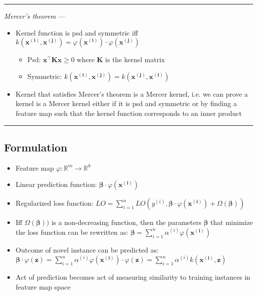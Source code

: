 {\color{lightgray}\hrule height 0.001mm}

\emph{Mercer's theorem} ---
\begin{itemize}
    \item Kernel function is psd and symmetric iff $k(\boldsymbol{x^{(i)}}, \boldsymbol{x^{(j)}}) = \varphi(\boldsymbol{x^{(i)}}) \cdot \varphi(\boldsymbol{x^{(j)}})$
    \begin{itemize}
        \item Psd: $\boldsymbol{x}^\intercal \boldsymbol{K} \boldsymbol{x} \geq 0$ where $\boldsymbol{K}$ is the kernel matrix
        \item Symmetric: $k(\boldsymbol{x^{(i)}}, \boldsymbol{x^{(j)}}) = k(\boldsymbol{x^{(j)}}, \boldsymbol{x^{(i)}})$
    \end{itemize}
    \item Kernel that satisfies Mercer's theorem is a Mercer kernel, i.e. we can prove a kernel is a Mercer kernel either if it is psd and symmetric or by finding a feature map such that the kernel function corresponds to an inner product    
\end{itemize}

{\color{black}\hrule height 0.001mm}

\subsection*{Formulation}

\begin{itemize}
    \item Feature map $\varphi: \mathbb{R}^m \rightarrow \mathbb{R}^k$
    \item Linear prediction function: $\boldsymbol{\beta} \cdot \varphi(\boldsymbol{x^{(i)}})$
    \item Regularized loss function: $LO = \sum_{i=1}^n LO(y^{(i)}, \boldsymbol{\beta} \cdot \varphi(\boldsymbol{x^{(i)}}) + \Omega( \boldsymbol{\beta} ))$
    \item Iff $\Omega( \boldsymbol{\beta} ))$ is a non-decreasing function, then the parameters $\boldsymbol{\beta}$ that minimize the loss function can be rewritten as: $\boldsymbol{\beta} = \sum_{i=1}^n \alpha^{(i)} \varphi( \boldsymbol{x^{(i)}} )$
    \item Outcome of novel instance can be predicted as: $\boldsymbol{\beta} \cdot \varphi({\boldsymbol{z}}) = \sum_{i=1}^n \alpha^{(i)} \varphi( \boldsymbol{x^{(i)}}) \cdot \varphi({\boldsymbol{z}}) = \sum_{i=1}^n \alpha^{(i)} k(\boldsymbol{x^{(i)}}, \boldsymbol{z})$
    \item Act of prediction becomes act of measuring similarity to training instances in feature map space
\end{itemize}


